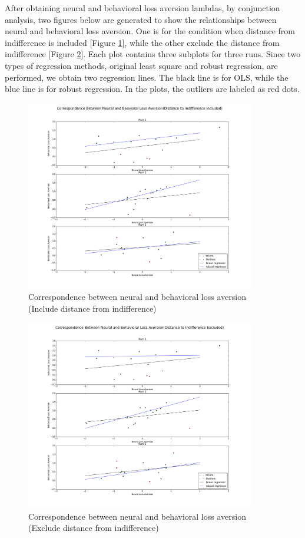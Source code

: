\par \indent After obtaining neural and behavioral loss aversion lambdas, by
conjunction analysis, two figures below are generated to show the relationships
between neural and behavioral loss aversion. One is for the condition when
distance from indifference is included [Figure \ref{fig:cor1}], while the other 
exclude the distance from indifference [Figure \ref{fig:cor2}]. Each plot 
contains three subplots for three runs. Since two types of regression methods, 
original least square and robust regression, are performed, we obtain two
regression lines. The black line is for OLS, while the blue line is for robust 
regression. In the plots, the outliers are labeled as red dots. 

\begin{figure}[h!]
\centering
\includegraphics[width=100mm]{images/correlation_dist2indiff.png}               
\caption{Correspondence between neural and behavioral loss aversion (Include
distance from indifference)}
\label{fig:cor1}
\end{figure}

\begin{figure}[h!]
\centering
\includegraphics[width=100mm]{images/correlation_no_dist2indiff.png}               
\caption{Correspondence between neural and behavioral loss aversion (Exclude
distance from indifference)}
\label{fig:cor2}
\end{figure}

